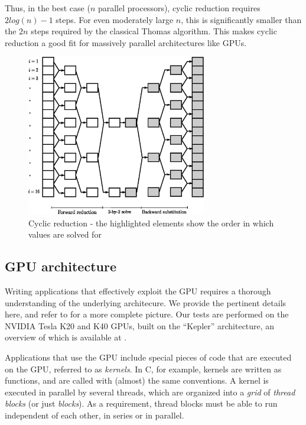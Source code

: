 \documentclass{elsarticle}
\begin{document}
Thus, in the best case ($n$ parallel processors),
cyclic reduction requires 
$2log(n) - 1$ steps.
For even moderately large $n$,
this is significantly smaller than
the $2n$ steps required by the classical Thomas algorithm.
This makes cyclic reduction a good fit
for massively parallel architectures like GPUs.

\begin{figure}[h!]
\begin{center}
\includegraphics[height=200pt]{img/cyclic-reduction.eps}
\end{center}
\caption{Cyclic reduction - the highlighted elements
show the order in which values are solved for}
\label{fig:cyclic-reduction}
\end{figure}

\subsection{GPU architecture} \label{sec:gpu-architecture}

Writing applications that effectively exploit the GPU
requires a thorough understanding of the underlying architecure.
We provide the pertinent details here,
and refer to \cite{GPUcomputingera} for a more complete picture.
Our tests are performed on the NVIDIA Tesla K20 and K40 GPUs,
built on the ``Kepler'' architecture,
an overview of which is available at \cite{Keplerwhitepaper}.

Applications that use the GPU include special
pieces of code that are executed on the GPU,
referred to as \emph{kernels}.
In C, for example, kernels are written as functions,
and are called with (almost) the same conventions.
A kernel is executed in parallel by several threads,
which are organized into a \emph{grid} of \emph{thread blocks}
(or just \emph{blocks}).
As a requirement, thread blocks must be able to run
independent of each other,
in series or in parallel.
\end{document}
